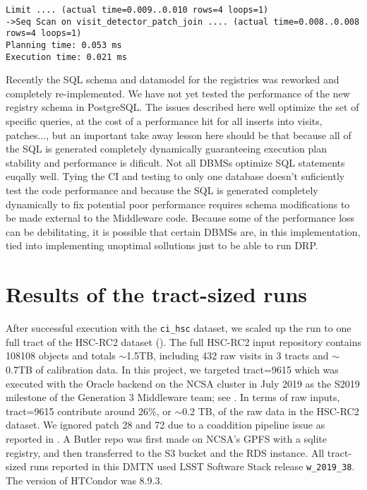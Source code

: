 \begin{lstlisting}[style=sqlprompt]
Limit .... (actual time=0.009..0.010 rows=4 loops=1)
->Seq Scan on visit_detector_patch_join .... (actual time=0.008..0.008 rows=4 loops=1)
Planning time: 0.053 ms
Execution time: 0.021 ms
\end{lstlisting}

Recently the SQL schema and datamodel for the registries was reworked and completely re-implemented. We have not yet tested the performance of the new registry schema in PostgreSQL. The issues described here well optimize the set of specific queries, at the cost of a performance hit for all inserts into visits, patches..., but an important take away lesson here should be that because all of the SQL is generated completely dynamically guaranteeing execution plan stability and performance is dificult. Not all DBMSs optimize SQL statements euqally well. Tying the CI and testing to only one database doesn't suficiently test the code performance and because the SQL is generated completely dynamically to fix potential poor performance requires schema modifications to be made external to the Middleware code. Because some of the performance loss can be debilitating, it is possible that certain DBMSs are, in this implementation, tied into implementing unoptimal sollutions just to be able to run DRP. 

\section{Results of the tract-sized runs}

After successful execution with the \texttt{ci\_hsc} dataset, we scaled up the run to one full tract of the HSC-RC2 dataset ().
The full HSC-RC2 input repository contains 108108 objects and totals $\sim$1.5TB, including 432 raw visits in 3 tracts and $\sim$0.7TB of calibration data.
In this project, we targeted tract=9615 which was executed with the Oracle backend on the NCSA cluster in July 2019 as the S2019 milestone of the Generation 3 Middleware team; see .
In terms of raw inputs, tract=9615 contribute around 26$\%$, or $\sim$0.2 TB, of the raw data in the HSC-RC2 dataset.
We ignored patch 28 and 72 due to a coaddition pipeline issue as reported in .
A Butler repo was first made on NCSA's GPFS with a sqlite registry, and then transferred to the S3 bucket and the RDS instance.
All tract-sized runs reported in this DMTN used LSST Software Stack release \texttt{w\_2019\_38}.
The version of HTCondor was 8.9.3.

